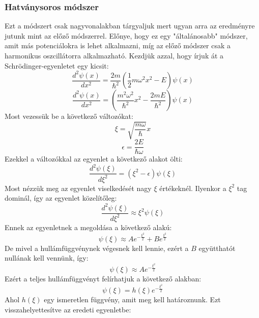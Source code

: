 \documentclass[a4paper,12pt]{article}
\begin{document}
\subsubsection*{Hatványsoros módszer}
Ezt a módszert csak nagyvonalakban tárgyaljuk mert ugyan arra az eredményre jutunk mint az előző módszerrel. Előnye,
hogy ez egy "általánosabb" módszer, amit más potenciálokra is lehet alkalmazni, míg az előző módszer csak a harmonikus oszcillátorra alkalmazható.
Kezdjük azzal, hogy írjuk át a Schrödinger-egyenletet egy kicsit:
\begin{equation}
    \frac{d^2 \psi(x)}{dx^2} = \frac{2m}{\hbar^2} \left( \frac{1}{2} m \omega^2 x^2 - E \right) \psi(x)
\end{equation}
\begin{equation}
    \frac{d^2 \psi(x)}{dx^2} = \left( \frac{m^2 \omega^2}{\hbar^2} x^2 - \frac{2mE}{\hbar^2} \right) \psi(x)
\end{equation}
Most vezessük be a következő változókat:
\begin{equation}
    \xi = \sqrt{\frac{m \omega}{\hbar}} x
\end{equation}
\begin{equation}
    \epsilon = \frac{2E}{\hbar \omega}
\end{equation}
Ezekkel a változókkal az egyenlet a következő alakot ölti:
\begin{equation}
    \frac{d^2 \psi(\xi)}{d \xi^2} = (\xi^2 - \epsilon) \psi(\xi)
\end{equation}
Most nézzük meg az egyenlet viselkedését nagy $\xi$ értékeknél. Ilyenkor a $\xi^2$ tag dominál, így az egyenlet közelítőleg:
\begin{equation}
    \frac{d^2 \psi(\xi)}{d \xi^2} \approx \xi^2 \psi(\xi)
\end{equation}
Ennek az egyenletnek a megoldása a következő alakú:
\begin{equation}
    \psi(\xi) \approx A e^{- \frac{\xi^2}{2}} + B e^{\frac{\xi^2}{2}}
\end{equation}
De mivel a hullámfüggvénynek végesnek kell lennie, ezért a $B$ együtthatót nullának kell vennünk, így:
\begin{equation}
    \psi(\xi) \approx A e^{- \frac{\xi^2}{2}}
\end{equation}
Ezért a teljes hullámfüggvényt felírhatjuk a következő alakban:
\begin{equation}
    \psi(\xi) = h(\xi) e^{- \frac{\xi^2}{2}}
\end{equation}
Ahol $h(\xi)$ egy ismeretlen függvény, amit meg kell határoznunk. Ezt visszahelyettesítve az eredeti egyenletbe:
\end{document}
